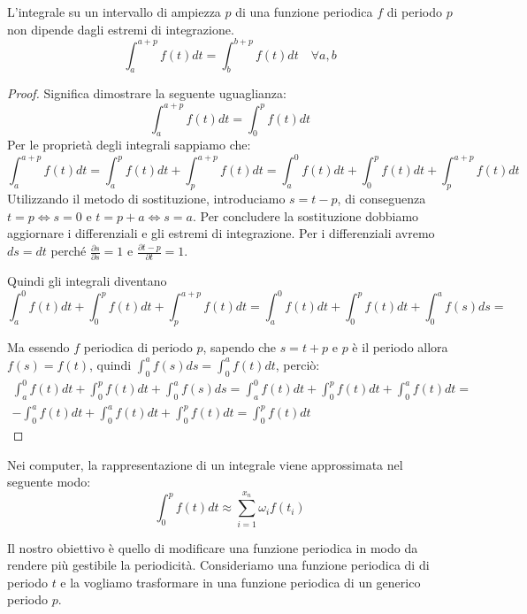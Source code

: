 \begin{proposizione}
    L'integrale su un intervallo di ampiezza $p$ di una funzione periodica $f$
    di periodo $p$ non dipende dagli estremi di integrazione.
    \begin{equation}
        \int_{a}^{a + p}f(t)dt = \int_{b}^{b + p}f(t)dt \quad \forall a,b
    \end{equation}
    \begin{proof}
        Significa dimostrare la seguente uguaglianza:
        \begin{equation*}
            \int_{a}^{a + p}f(t)dt = \int_{0}^{p}f(t)dt
        \end{equation*}
        Per le proprietà degli integrali sappiamo che:
        \begin{equation*}
            \int_{a}^{a+p}f(t)dt =  \int_{a}^{p}f(t)dt + \int_{p}^{a+p}f(t)dt =
            \int_{a}^{0}f(t)dt +\int_{0}^{p}f(t)dt+ \int_{p}^{a+p}f(t)dt
        \end{equation*}
        Utilizzando il metodo di sostituzione, introduciamo $s = t - p$, di conseguenza
        $t= p \iff s=0$ e $t = p + a \iff s = a$. Per concludere la sostituzione
        dobbiamo aggiornare i differenziali e gli estremi di integrazione.
        Per i differenziali avremo $ds = dt$ perché $\frac{\partial s}{\partial s} = 1$
        e $\frac{\partial t-p}{\partial t} = 1$.

        Quindi gli integrali diventano
        \begin{equation*}
            \int_{a}^{0}f(t)dt +\int_{0}^{p}f(t)dt+ \int_{p}^{a+p}f(t)dt =
            \int_{a}^{0}f(t)dt +\int_{0}^{p}f(t)dt+ \int_{0}^{a}f(s)ds =
        \end{equation*}

        Ma essendo $f$ periodica di periodo $p$, sapendo che $s = t + p$ e $p$ è
        il periodo allora $f(s) = f(t)$, quindi $\int_{0}^{a}f(s)ds = \int_{0}^{a}f(t)dt$,
        perciò:
        \begin{equation*}
            \begin{aligned}
                \int_{a}^{0}f(t)dt + \int_{0}^{p}f(t)dt + \int_{0}^{a}f(s)ds =
                \int_{a}^{0}f(t)dt + \int_{0}^{p}f(t)dt + \int_{0}^{a}f(t)dt = \\
                -\int_{0}^{a}f(t)dt + \int_{0}^{a}f(t)dt + \int_{0}^{p}f(t)dt =
                \int_{0}^{p}f(t)dt
            \end{aligned}
        \end{equation*}
    \end{proof}
\end{proposizione}
\begin{nota}
    Nei computer, la rappresentazione di un integrale viene approssimata nel
    seguente modo:
    \begin{equation*}
        \int_{0}^{p}f(t)dt \approx \sum_{i=1}^{x_n}\omega_i f(t_i)
    \end{equation*}
\end{nota}
Il nostro obiettivo è quello di modificare una funzione periodica in modo da
rendere più gestibile la periodicità. Consideriamo una funzione periodica di
di periodo $t$ e la vogliamo trasformare in una funzione periodica di un generico
periodo $p$.

